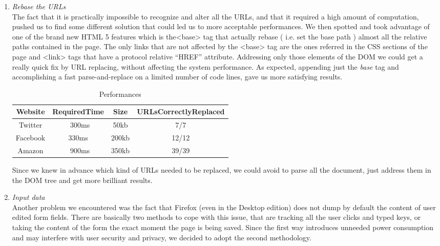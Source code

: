 \documentclass[11pt,a4paper]{article}
\begin{document}
\begin{enumerate}
	\newpage
\item \emph{Rebase the URLs} \\
	The fact that it is practically impossible to recognize and alter all the URLs, and that it required a high amount of computation, pushed us to find some different solution that could led us to more acceptable performances. We then spotted and took advantage of one of the brand new HTML 5 features which is the<base> tag that actually rebase ( i.e. set the base path )  almost all the relative paths contained in the page. The only links that are not affected by the <base> tag are the ones referred in the CSS sections of the page and <link> tags that have a protocol relative “HREF” attribute. Addressing only those elements of the DOM we could get a really quick fix by URL replacing, without affecting the system performance.
	As expected, appending just the \emph{base} tag and accomplishing a fast parse-and-replace on a limited number of code lines, gave us more satisfying results.\\
	\begin{table}[!ht]
	\centering
	\caption{Performances}
	\begin{tabular}{cccc}
	\toprule
	Website & RequiredTime & Size & URLsCorrectlyReplaced\\
	\midrule
	Twitter & 300ms & 50kb & 7/7 \\
	Facebook & 330ms & 200kb & 12/12 \\
	Amazon & 900ms & 350kb & 39/39 \\
	\bottomrule
	\end{tabular}
	\end{table}
	
	Since we knew in advance which kind of URLs needed to be replaced, we could avoid to parse all the document, just address them in the DOM tree and get more brilliant results.


\item \emph{Input data}\\
	Another problem we encountered was the fact that Firefox (even in the Desktop edition) does not dump by default the content of user edited form fields. There are basically two methods to cope with this issue, that are tracking all the user clicks and typed keys, or taking the content of the form the exact moment the page is being saved.
	Since the first way introduces unneeded power consumption and may interfere with user security and privacy, we decided to adopt the second methodology. 

\end{enumerate}
\end{document}
